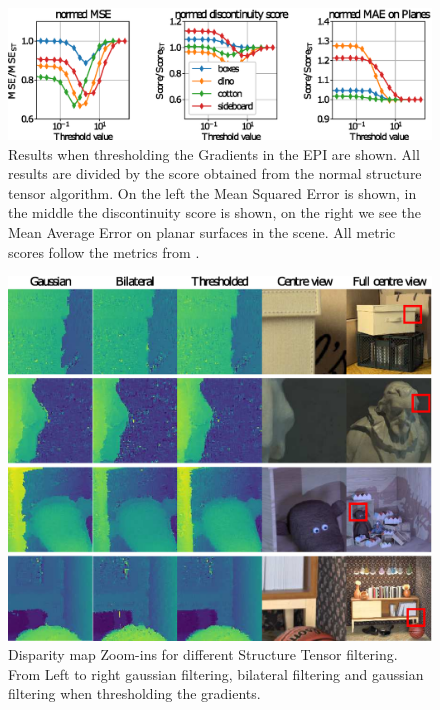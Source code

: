 \documentclass  [
  paper    = a4,
  BCOR     = 10mm,
  twoside,
  fontsize = 12pt,
  fleqn,
  toc      = bibnumbered,
  toc      = listofnumbered,
  numbers  = noendperiod,
  headings = normal,
  listof   = leveldown,
  version  = 3.03
]                                       {scrreprt}
\begin{document}
\begin{figure}
	\centering
	\includegraphics[width=1\linewidth]{images/thresh_params}
	\caption[Results when thresholding the Gradients in the EPI]{Results when thresholding the Gradients in the EPI are shown. All results are divided by the score obtained from the normal structure tensor algorithm. On the left the Mean Squared Error is shown, in the middle the discontinuity score is shown, on the right we see the Mean Average Error on planar surfaces in the scene. All metric scores follow the metrics from \cite{honauer2016benchmark}. }
	\label{fig:threshparams}
\end{figure}
\begin{figure}
	\centering
	\includegraphics[width=1\linewidth]{images/thresh_results}
	\caption[Disparity map Zoom-ins for different methods]{Disparity map Zoom-ins for different Structure Tensor filtering. From Left to right gaussian filtering, bilateral filtering and gaussian filtering when thresholding the gradients.}
	\label{fig:threshresults}
\end{figure}
\end{document}
